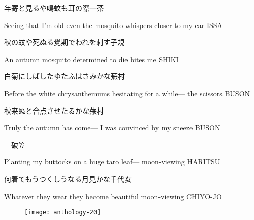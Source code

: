 \begin{haiku}
    {\FH 年寄と見るや鳴蚊も耳の際}\hfill{\FH 一茶}

    \vin{} Seeing that I'm old
    \vin{} \vin{} even the mosquito whispers
    \vin{} \vin{} \vin{} closer to my ear \hspace{\fill} ISSA
\end{haiku}

\begin{haiku}
    {\FH 秋の蚊や死ぬる覺期でわれを刺す}\hfill{\FH 子規}

    \vin{} An autumn mosquito
    \vin{} \vin{} determined to die
    \vin{} \vin{} \vin{} bites me \hspace{\fill} SHIKI
\end{haiku}

\begin{haiku}
    {\FH 白菊にしばしたゆたふはさみかな}\hfill{\FH 蕪村}

    \vin{} Before the white chrysanthemums
    \vin{} \vin{} hesitating for a while---
    \vin{} \vin{} \vin{} the scissors \hspace{\fill} BUSON
\end{haiku}

\begin{haiku}
    {\FH 秋来ぬと合点させたるかな}\hfill{\FH 蕪村}

    \vin{} Truly the autumn has come---
    \vin{} \vin{} I was convinced
    \vin{} \vin{} \vin{} by my sneeze \hspace{\fill} BUSON
\end{haiku}

\begin{haiku}
    {---}\hfill{\FH 破笠}

    \vin{} Planting my buttocks
    \vin{} \vin{} on a huge taro leaf---
    \vin{} \vin{} \vin{} moon-viewing \hspace{\fill} HARITSU
\end{haiku}

\begin{haiku}
    {\FH 何着てもうつくしうなる月見かな}\hfill{\FH 千代女}

    \vin{} Whatever they wear
    \vin{} \vin{} they become beautiful
    \vin{} \vin{} \vin{} moon-viewing \hspace{\fill} CHIYO-JO
\end{haiku}

\begin{figure}
    \texttt{[image: anthology-20]}
\end{figure}

